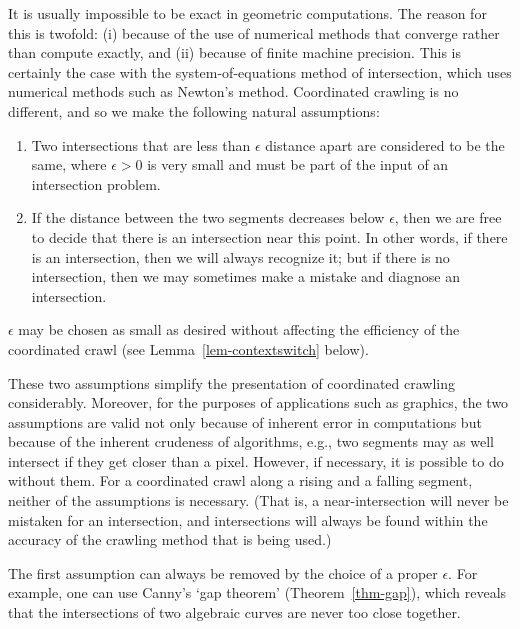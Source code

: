 It is usually impossible to be exact in geometric computations.
The reason for this is twofold: (i)
because of the use of numerical methods that converge rather
than compute exactly, and (ii) because of finite machine precision.
This is certainly the case with the system-of-equations method of intersection, 
which uses numerical methods such as Newton's method.
Coordinated crawling is no different, and so we make the following natural assumptions:
\begin{enumerate}
\item
	Two intersections that are less than $\epsilon$ distance apart are considered 
	to be the same, where $\epsilon > 0$ is very small and must be part of the input 
	of an intersection problem.
\item
	If the distance between the two segments decreases below $\epsilon$, 
	then we are free to decide that there is an intersection near this point.
        In other words, if there is an intersection, then we will always recognize it;
\label{ass2}
	but if there is no intersection, then we may sometimes make a mistake and 
	diagnose an intersection.
\end{enumerate}
$\epsilon$ may be chosen as small as desired without affecting the efficiency of the 
coordinated crawl (see Lemma~\ref{lem-contextswitch} below).

These two assumptions simplify the presentation of coordinated crawling considerably.
Moreover, for the purposes of applications such as graphics,
the two assumptions are valid not only because of inherent error in computations 
but because of the inherent crudeness of algorithms, e.g., two segments may as well 
intersect if they get closer than a pixel.
However, if necessary, it is possible to do without them.
For a coordinated crawl along a rising and a falling segment,
neither of the assumptions is necessary.
(That is, a near-intersection will never be mistaken for an intersection, 
and intersections will always be found within the accuracy 
	of the crawling method that is being used.)
%
%
%

The first assumption can always be removed by the choice of a proper $\epsilon$.
For example, one can use Canny's `gap theorem' (Theorem~\ref{thm-gap}), which 
reveals that the intersections of two algebraic curves are never too close together.

